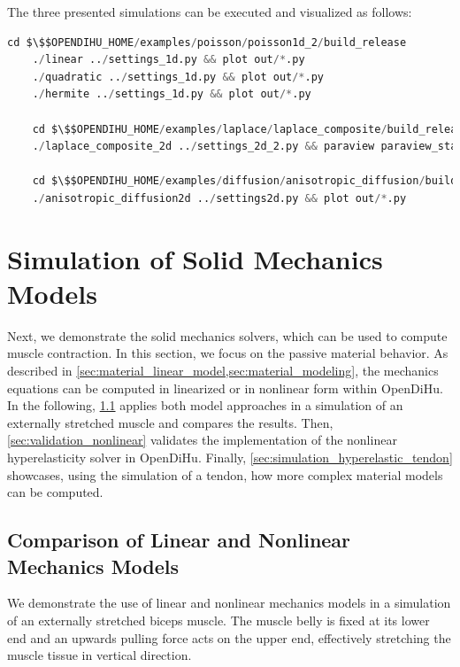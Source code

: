 \begin{reproduce_no_break}
  The three presented simulations can be executed and visualized as follows:
  \begin{lstlisting}[columns=fullflexible,breaklines=true,postbreak=\mbox{\textcolor{gray}{$\hookrightarrow$}\space},language=python]
    cd $\$$OPENDIHU_HOME/examples/poisson/poisson1d_2/build_release
    ./linear ../settings_1d.py && plot out/*.py
    ./quadratic ../settings_1d.py && plot out/*.py
    ./hermite ../settings_1d.py && plot out/*.py

    cd $\$$OPENDIHU_HOME/examples/laplace/laplace_composite/build_release/
    ./laplace_composite_2d ../settings_2d_2.py && paraview paraview_state.pvsm

    cd $\$$OPENDIHU_HOME/examples/diffusion/anisotropic_diffusion/build_release
    ./anisotropic_diffusion2d ../settings2d.py && plot out/*.py
  \end{lstlisting}
\end{reproduce_no_break}

\section{Simulation of Solid Mechanics Models}\label{sec:solver_solid_mechanics}

Next, we demonstrate the solid mechanics solvers, which can be used to compute muscle contraction. In this section, we focus on the passive material behavior.
As described in \cref{sec:material_linear_model,sec:material_modeling}, the mechanics equations can be computed in linearized or in nonlinear form within OpenDiHu.
In the following, \cref{sec:comparison_linear_nonlinear} applies both model approaches in a simulation of an externally stretched muscle and compares the results. Then, \cref{sec:validation_nonlinear} validates the implementation of the nonlinear hyperelasticity solver in OpenDiHu. Finally, \cref{sec:simulation_hyperelastic_tendon} showcases, using the simulation of a tendon, how more complex material models can be computed.

\subsection{Comparison of Linear and Nonlinear Mechanics Models}\label{sec:comparison_linear_nonlinear}

We demonstrate the use of linear and nonlinear mechanics models in a simulation of an externally stretched biceps muscle. The muscle belly is fixed at its lower end and an upwards pulling force acts on the upper end, effectively stretching the muscle tissue in vertical direction.

